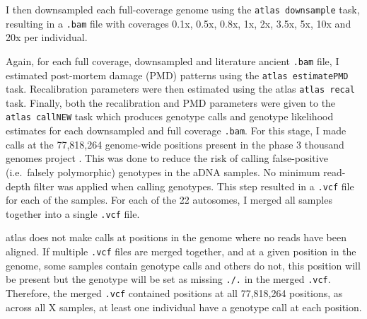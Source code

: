 {I then downsampled each full-coverage genome using the \texttt{atlas downsample} task, resulting in a \texttt{.bam} file with coverages 0.1x, 0.5x, 0.8x, 1x, 2x, 3.5x, 5x, 10x and 20x per individual. 

Again, for each full coverage, downsampled and literature ancient \texttt{.bam} file, I estimated post-mortem damage (PMD) patterns using the \texttt{atlas estimatePMD} task. Recalibration parameters were then estimated using the atlas \texttt{atlas recal} task. Finally, both the recalibration and PMD parameters were given to the \texttt{atlas callNEW} task which produces genotype calls and genotype likelihood estimates for each downsampled and full coverage \texttt{.bam}. For this stage, I made calls at the 77,818,264 genome-wide positions present in the phase 3 thousand genomes project \cite{1000GenomesProjectConsortium2015}. This was done to reduce the risk of calling false-positive (i.e.\ falsely polymorphic) genotypes in the aDNA samples. No minimum read-depth filter was applied when calling genotypes. This step resulted in a \texttt{.vcf} file for each of the samples. For each of the 22 autosomes, I merged all samples together into a single \texttt{.vcf} file. 

atlas does not make calls at positions in the genome where no reads have been aligned. If multiple \texttt{.vcf} files are merged together, and at a given position in the genome, some samples contain genotype calls and others do not, this position will be present but the genotype will be set as missing \texttt{./.} in  the merged \texttt{.vcf}. Therefore, the merged \texttt{.vcf} contained positions at all 77,818,264 positions, as across all X samples, at least one individual have a genotype call at each position. 


}
